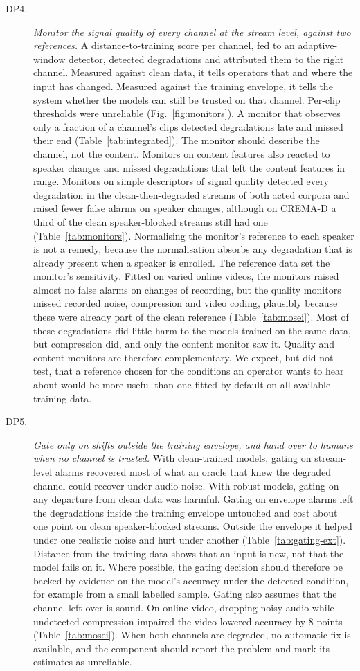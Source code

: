 \begin{description}
\item[DP4.] \emph{Monitor the signal quality of every channel at the stream level, against two references.} A distance-to-training score per channel, fed to an adaptive-window detector, detected degradations and attributed them to the right channel. Measured against clean data, it tells operators that and where the input has changed. Measured against the training envelope, it tells the system whether the models can still be trusted on that channel. Per-clip thresholds were unreliable (Fig.~\ref{fig:monitors}). A monitor that observes only a fraction of a channel's clips detected degradations late and missed their end (Table~\ref{tab:integrated}). The monitor should describe the channel, not the content. Monitors on content features also reacted to speaker changes and missed degradations that left the content features in range. Monitors on simple descriptors of signal quality detected every degradation in the clean-then-degraded streams of both acted corpora and raised fewer false alarms on speaker changes, although on CREMA-D a third of the clean speaker-blocked streams still had one (Table~\ref{tab:monitors}). Normalising the monitor's reference to each speaker is not a remedy, because the normalisation absorbs any degradation that is already present when a speaker is enrolled. The reference data set the monitor's sensitivity. Fitted on varied online videos, the monitors raised almost no false alarms on changes of recording, but the quality monitors missed recorded noise, compression and video coding, plausibly because these were already part of the clean reference (Table~\ref{tab:mosei}). Most of these degradations did little harm to the models trained on the same data, but compression did, and only the content monitor saw it. Quality and content monitors are therefore complementary. We expect, but did not test, that a reference chosen for the conditions an operator wants to hear about would be more useful than one fitted by default on all available training data.
\item[DP5.] \emph{Gate only on shifts outside the training envelope, and hand over to humans when no channel is trusted.} With clean-trained models, gating on stream-level alarms recovered most of what an oracle that knew the degraded channel could recover under audio noise. With robust models, gating on any departure from clean data was harmful. Gating on envelope alarms left the degradations inside the training envelope untouched and cost about one point on clean speaker-blocked streams. Outside the envelope it helped under one realistic noise and hurt under another (Table~\ref{tab:gating-ext}). Distance from the training data shows that an input is new, not that the model fails on it. Where possible, the gating decision should therefore be backed by evidence on the model's accuracy under the detected condition, for example from a small labelled sample. Gating also assumes that the channel left over is sound. On online video, dropping noisy audio while undetected compression impaired the video lowered accuracy by 8 points (Table~\ref{tab:mosei}). When both channels are degraded, no automatic fix is available, and the component should report the problem and mark its estimates as unreliable.

\end{description}
